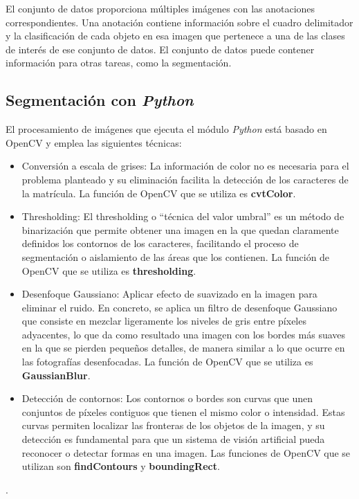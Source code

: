 El conjunto de datos proporciona múltiples imágenes con las anotaciones correspondientes. Una anotación contiene información sobre el cuadro delimitador y la clasificación de cada objeto en esa imagen que pertenece a una de las clases de interés de ese conjunto de datos. El conjunto de datos puede contener información para otras tareas, como la segmentación\cite{lin2014microsoft}.

\subsection{Segmentación con \textit{Python}}
 El procesamiento de imágenes que ejecuta el módulo \textit{Python} está basado en OpenCV y emplea las siguientes técnicas: 
\begin{itemize}
    \item Conversión a escala de grises: La información de color no es necesaria para el problema planteado y su eliminación facilita la detección de los caracteres de la matrícula. La función  de OpenCV que se utiliza es \textbf{cvtColor}.
    
    \item Thresholding: El thresholding o “técnica del valor umbral” es un método de binarización que permite obtener una imagen en la que quedan claramente definidos los contornos de los caracteres, facilitando el proceso de segmentación o aislamiento de las áreas que los contienen. La función  de OpenCV que se utiliza es \textbf{thresholding}.
    
    \item Desenfoque Gaussiano: Aplicar efecto de suavizado en la imagen para eliminar el ruido. En concreto, se aplica un filtro de desenfoque Gaussiano que consiste en mezclar ligeramente los niveles de gris entre píxeles adyacentes, lo que da como resultado una imagen con los bordes más suaves en la que se pierden pequeños detalles, de manera similar a lo que ocurre en las fotografías desenfocadas. La función  de OpenCV que se utiliza es \textbf{GaussianBlur}.
    
    \item Detección de contornos: Los contornos o bordes son curvas que unen conjuntos de píxeles contiguos que tienen el mismo color o intensidad. Estas curvas permiten localizar las fronteras de los objetos de la imagen, y su detección es fundamental para que un sistema de visión artificial pueda reconocer o detectar formas en una imagen. Las funciones  de OpenCV que se utilizan son \textbf{findContours} y \textbf{boundingRect}.
\end{itemize}.
